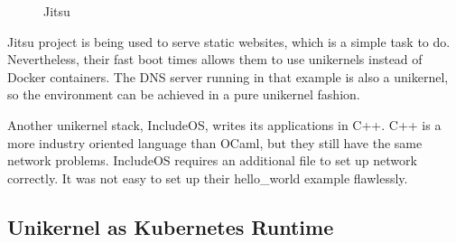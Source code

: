 \begin{figure}[h!]
\centering
\begin {sequencediagram}


\end {sequencediagram}
\caption{Jitsu \cite{jitsu}}\label{fig:jitsu}
\end{figure}

Jitsu project is being used to serve static websites, which is a simple task to do. Nevertheless, their fast boot times allows them to use unikernels instead of Docker containers. The DNS server running in that example is also a unikernel, so the environment can be achieved in a pure unikernel fashion.

Another unikernel stack, IncludeOS, writes its applications in C++. C++ is a more industry oriented language than OCaml, but they still have the same network problems. IncludeOS requires an additional file to set up network correctly. It was not easy to set up their hello\_world example flawlessly.
\pagebreak
\subsection{Unikernel as Kubernetes Runtime}

